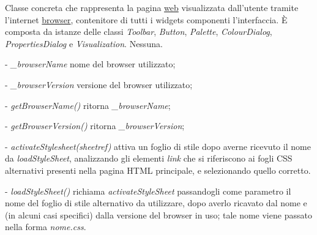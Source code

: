 Classe concreta che rappresenta la pagina \underline{web} visualizzata dall'utente tramite l'internet \underline{browser}, contenitore di tutti i widgets componenti l'interfaccia.
\` E composta da istanze delle classi \textit{Toolbar}, \textit{Button}, \textit{Palette}, \textit{ColourDialog}, \textit{PropertiesDialog} e \textit{Visualization}.
Nessuna.
\begin{elencopuntato}[\subsubsecindent]
\item[-] \textit{{\_}browserName} nome del browser utilizzato;
\item[-] \textit{{\_}browserVersion} versione del browser utilizzato;
\end{elencopuntato}
\begin{elencopuntato}[\subsubsecindent]
\item[-] \textit{getBrowserName()} ritorna \textit{{\_}browserName};
\item[-] \textit{getBrowserVersion()} ritorna \textit{{\_}browserVersion};
\item[-] \textit{activateStylesheet(sheetref)} attiva un foglio di stile dopo averne ricevuto il nome da \textit{loadStyleSheet}, analizzando gli elementi \textit{link} che si riferiscono ai fogli CSS alternativi presenti nella pagina HTML principale, e selezionando quello corretto.  
\item[-] \textit{loadStyleSheet()} richiama \textit{activateStyleSheet} passandogli come parametro il nome del foglio di stile alternativo da utilizzare, dopo averlo ricavato dal nome e (in alcuni casi specifici) dalla versione del browser in uso; tale nome viene passato nella forma \textit{nome.css}.
\end{elencopuntato}

